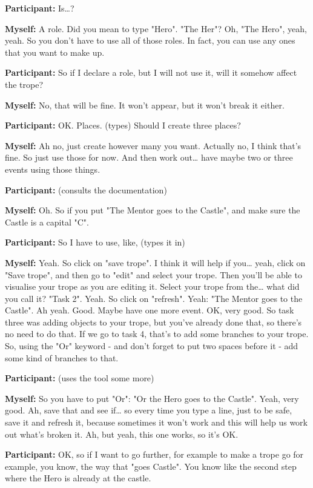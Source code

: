 \documentclass[11pt]{report}
\begin{document}
\begin{linenumbers}
\textbf{Participant:} Is\ldots{}?

\textbf{Myself:} A role. Did you mean to type "Hero". "The Her"? Oh, "The Hero", yeah, yeah. So you don't have to use all of those roles. In fact, you can use any ones that you want to make up.

\textbf{Participant:} So if I declare a role, but I will not use it, will it somehow affect the trope?

\textbf{Myself:} No, that will be fine. It won't appear, but it won't break it either.

\textbf{Participant:} OK. Places. (types) Should I create three places?

\textbf{Myself:} Ah no, just create however many you want. Actually no, I think that's fine. So just use those for now. And then work out\ldots{} have maybe two or three events using those things.

\textbf{Participant:} (consults the documentation)

\textbf{Myself:} Oh. So if you put "The Mentor goes to the Castle", and make sure the Castle is a capital "C".

\textbf{Participant:} So I have to use, like, (types it in)

\textbf{Myself:} Yeah. So click on "save trope". I think it will help if you\ldots{} yeah, click on "Save trope", and then go to "edit" and select your trope. Then you'll be able to visualise your trope as you are editing it. Select your trope from the\ldots{} what did you call it? "Task 2". Yeah. So click on "refresh". Yeah: "The Mentor goes to the Castle". Ah yeah. Good. Maybe have one more event. OK, very good. So task three was adding objects to your trope, but you've already done that, so there's no need to do that. If we go to task 4, that's to add some branches to your trope. So, using the "Or" keyword - and don't forget to put two spaces before it - add some kind of branches to that.

\textbf{Participant:} (uses the tool some more)

\textbf{Myself:} So you have to put "Or": "Or the Hero goes to the Castle". Yeah, very good. Ah, save that and see if\ldots{} so every time you type a line, just to be safe, save it and refresh it, because sometimes it won't work and this will help us work out what's broken it. Ah, but yeah, this one works, so it's OK.

\textbf{Participant:} OK, so if I want to go further, for example to make a
trope go for example, you know, the way that "goes Castle". You know like the
second step where the Hero is already at the castle.


\end{linenumbers}
\end{document}
